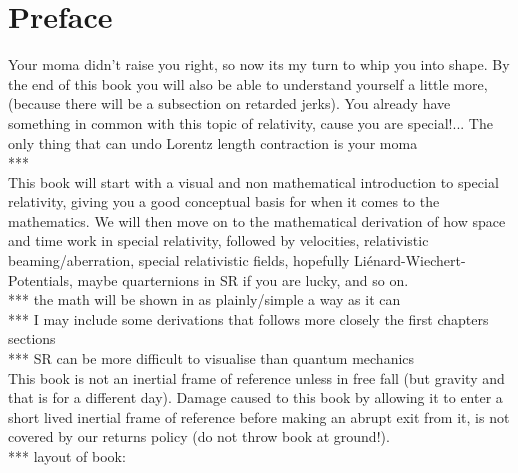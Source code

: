 \frontmatter
\chapter{Preface}

Your moma didn't raise you right, so now its my turn to whip you into shape. By the end of this book you will also be able to understand yourself a little more, (because there will be a subsection on retarded jerks). You already have something in common with this topic of relativity, cause you are special!... The only thing that can undo Lorentz length contraction is your moma
\\
***\\
This book will start with a visual and non mathematical introduction to special relativity, giving you a good conceptual basis for when it comes to the mathematics. We will then move on to the mathematical derivation of how space and time work in special relativity, followed by velocities, relativistic beaming/aberration, special relativistic fields, hopefully Liénard-Wiechert-Potentials, maybe quarternions in SR if you are lucky, and so on. \\
*** the math will be shown in as plainly/simple a way as it can\\
*** I may include some derivations that follows more closely the first chapters sections\\
*** SR can be more difficult to visualise than quantum mechanics\\
This book is not an inertial frame of reference unless in free fall (but gravity and that is for a different day). Damage caused to this book by allowing it to enter a short lived inertial frame of reference before making an abrupt exit from it, is not covered by our returns policy (do not throw book at ground!). \\

*** layout of book:

\newpage